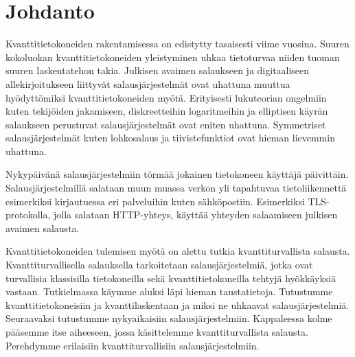 \chapter{Johdanto\label{intro}}
Kvanttitietokoneiden rakentamisessa on edistytty tasaisesti viime vuosina. Suuren kokoluokan kvanttitietokoneiden yleistyminen uhkaa tietoturvaa niiden tuoman suuren laskentatehon takia. Julkisen avaimen salaukseen ja digitaaliseen allekirjoitukseen liittyvät salausjärjestelmät ovat uhattuna muuttua hyödyttömiksi kvanttitietokoneiden myötä. Erityisesti lukuteorian ongelmiin kuten tekijöiden jakamiseen, diskreetteihin logaritmeihin ja elliptisen käyrän salaukseen perustuvat salausjärjestelmät ovat eniten uhattuna. Symmetriset salausjärjestelmät kuten lohkosalaus ja tiivistefunktiot ovat hieman lievemmin uhattuna.

Nykypäivänä salausjärjestelmiin törmää jokainen tietokoneen käyttäjä päivittäin. Salausjärjestelmillä salataan muun muassa verkon yli tapahtuvaa tietoliikennettä esimerkiksi kirjautuessa eri palveluihin kuten sähköpostiin. Esimerkiksi TLS-protokolla, jolla salataan HTTP-yhteys, käyttää yhteyden salaamiseen julkisen avaimen salausta. 

Kvanttitietokoneiden tulemisen myötä on alettu tutkia kvanttiturvallista salausta. Kvanttiturvallisella salauksella tarkoitetaan salausjärjestelmiä, jotka ovat turvallisia klassisilla tietokoneilla sekä kvanttitietokoneilla tehtyjä hyökkäyksiä vastaan. Tutkielmassa käymme aluksi läpi hieman taustatietoja. Tutustumme kvanttitietokoneisiin ja kvanttilaskentaan ja miksi ne uhkaavat salausjärjestelmiä. Seuraavaksi tutustumme nykyaikaisiin salausjärjestelmiin. Kappaleessa kolme pääsemme itse aiheeseen, jossa käsittelemme kvanttiturvallista salausta. Perehdymme erilaisiin kvanttiturvallisiin salausjärjestelmiin.